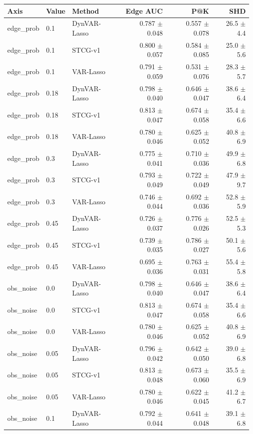 \begin{tabular}{lllrrr}
\toprule
Axis & Value & Method & Edge AUC & P@K & SHD \\
\midrule
edge_prob & 0.1 & DynVAR-Lasso & 0.787 $\pm$ 0.048 & 0.557 $\pm$ 0.078 & 26.5 $\pm$ 4.4 \\
edge_prob & 0.1 & STCG-v1 & 0.800 $\pm$ 0.057 & 0.584 $\pm$ 0.085 & 25.0 $\pm$ 5.6 \\
edge_prob & 0.1 & VAR-Lasso & 0.791 $\pm$ 0.059 & 0.531 $\pm$ 0.076 & 28.3 $\pm$ 5.7 \\
edge_prob & 0.18 & DynVAR-Lasso & 0.798 $\pm$ 0.040 & 0.646 $\pm$ 0.047 & 38.6 $\pm$ 6.4 \\
edge_prob & 0.18 & STCG-v1 & 0.813 $\pm$ 0.047 & 0.674 $\pm$ 0.058 & 35.4 $\pm$ 6.6 \\
edge_prob & 0.18 & VAR-Lasso & 0.780 $\pm$ 0.046 & 0.625 $\pm$ 0.052 & 40.8 $\pm$ 6.9 \\
edge_prob & 0.3 & DynVAR-Lasso & 0.775 $\pm$ 0.041 & 0.710 $\pm$ 0.036 & 49.9 $\pm$ 6.8 \\
edge_prob & 0.3 & STCG-v1 & 0.793 $\pm$ 0.049 & 0.722 $\pm$ 0.049 & 47.9 $\pm$ 9.7 \\
edge_prob & 0.3 & VAR-Lasso & 0.746 $\pm$ 0.044 & 0.692 $\pm$ 0.036 & 52.8 $\pm$ 5.9 \\
edge_prob & 0.45 & DynVAR-Lasso & 0.726 $\pm$ 0.037 & 0.776 $\pm$ 0.026 & 52.5 $\pm$ 5.3 \\
edge_prob & 0.45 & STCG-v1 & 0.739 $\pm$ 0.035 & 0.786 $\pm$ 0.027 & 50.1 $\pm$ 5.6 \\
edge_prob & 0.45 & VAR-Lasso & 0.695 $\pm$ 0.036 & 0.763 $\pm$ 0.031 & 55.4 $\pm$ 5.8 \\
obs_noise & 0.0 & DynVAR-Lasso & 0.798 $\pm$ 0.040 & 0.646 $\pm$ 0.047 & 38.6 $\pm$ 6.4 \\
obs_noise & 0.0 & STCG-v1 & 0.813 $\pm$ 0.047 & 0.674 $\pm$ 0.058 & 35.4 $\pm$ 6.6 \\
obs_noise & 0.0 & VAR-Lasso & 0.780 $\pm$ 0.046 & 0.625 $\pm$ 0.052 & 40.8 $\pm$ 6.9 \\
obs_noise & 0.05 & DynVAR-Lasso & 0.796 $\pm$ 0.042 & 0.642 $\pm$ 0.050 & 39.0 $\pm$ 6.8 \\
obs_noise & 0.05 & STCG-v1 & 0.813 $\pm$ 0.048 & 0.673 $\pm$ 0.060 & 35.5 $\pm$ 6.9 \\
obs_noise & 0.05 & VAR-Lasso & 0.780 $\pm$ 0.046 & 0.622 $\pm$ 0.045 & 41.2 $\pm$ 6.7 \\
obs_noise & 0.1 & DynVAR-Lasso & 0.792 $\pm$ 0.044 & 0.641 $\pm$ 0.048 & 39.1 $\pm$ 6.8 \\

\end{tabular}
